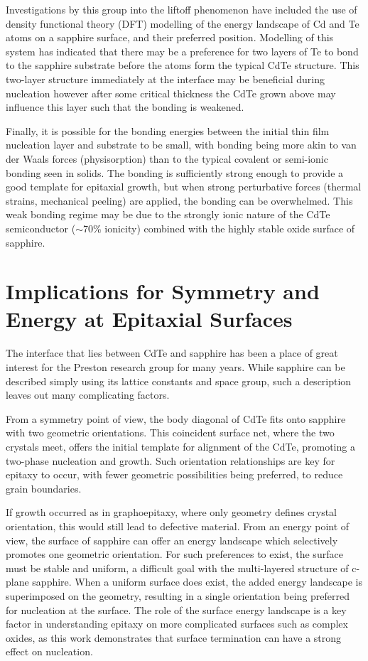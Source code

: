 Investigations by this group into the liftoff phenomenon have included the use of density functional theory (DFT) modelling of the energy landscape of Cd and Te atoms on a sapphire surface, and their preferred position.
Modelling of this system has indicated that there may be a preference for two layers of Te to bond to the sapphire substrate before the atoms form the typical CdTe structure.
This two-layer structure immediately at the interface may be beneficial during nucleation however after some critical thickness the CdTe grown above may influence this layer such that the bonding is weakened.

Finally, it is possible for the bonding energies between the initial thin film nucleation layer and substrate to be small, with bonding being more akin to van der Waals forces (physisorption) than to the typical covalent or semi-ionic bonding seen in solids.
The bonding is sufficiently strong enough to provide a good template for epitaxial growth, but when strong perturbative forces (thermal strains, mechanical peeling) are applied, the bonding can be overwhelmed.
This weak bonding regime may be due to the strongly ionic nature of the CdTe semiconductor (\(\sim\)70\% ionicity) combined with the highly stable oxide surface of sapphire.
\section{Implications for Symmetry and Energy at Epitaxial Surfaces}
The interface that lies between CdTe and sapphire has been a place of great interest for the Preston research group for many years.
While sapphire can be described simply using its lattice constants and space group, such a description leaves out many complicating factors.

From a symmetry point of view, the body diagonal of CdTe fits onto sapphire with two geometric orientations.
This coincident surface net, where the two crystals meet, offers the initial template for alignment of the CdTe, promoting a two-phase nucleation and growth.
Such orientation relationships are key for epitaxy to occur, with fewer geometric possibilities being preferred, to reduce grain boundaries.

If growth occurred as in graphoepitaxy, where only geometry defines crystal orientation, this would still lead to defective material.
From an energy point of view, the surface of sapphire can offer an energy landscape which selectively promotes one geometric orientation.
For such preferences to exist, the surface must be stable and uniform, a difficult goal with the multi-layered structure of c-plane sapphire.
When a uniform surface does exist, the added energy landscape is superimposed on the geometry, resulting in a single orientation being preferred for nucleation at the surface.
The role of the surface energy landscape is a key factor in understanding epitaxy on more complicated surfaces such as complex oxides, as this work demonstrates that surface termination can have a strong effect on nucleation.
